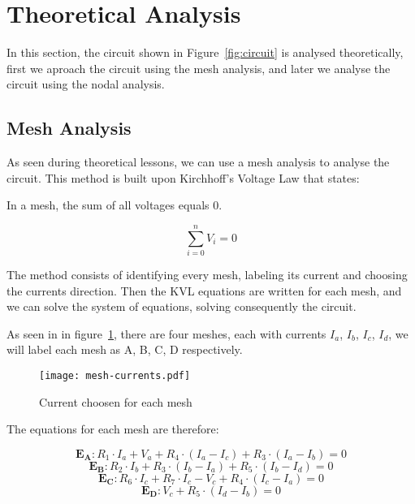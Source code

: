 \section{Theoretical Analysis}
\label{sec:analysis}

In this section, the circuit shown in Figure~\ref{fig:circuit} is analysed
theoretically, first we aproach the circuit using the mesh analysis, and later we analyse the circuit using the nodal analysis.

\subsection{Mesh Analysis}

As seen during theoretical lessons, we can use a mesh analysis to analyse the circuit.
This method is built upon Kirchhoff's Voltage Law that states:

In a mesh, the sum of all voltages equals 0.

\begin{equation}
  \sum_{i=0}^{n} V_i = 0
  \label{eq:kvl}
\end{equation}

The method consists of identifying every mesh, labeling its current and choosing the currents direction.
Then the KVL equations are written for each mesh, and we can solve the system of equations, solving consequently the circuit.

As seen in in figure~\ref{fig:mesh}, there are four meshes, each with currents $I_a$, $I_b$, $I_c$, $I_d$, 
we will label each mesh as A, B, C, D respectively.
\begin{figure}[h] \centering
  \texttt{[image: mesh-currents.pdf]}
  \caption{Current choosen for each mesh}
  \label{fig:mesh}
  \end{figure}

The equations for each mesh are therefore:

\begin{equation}
  \mathbf{E_A} : R_1 \cdot I_a + V_a + R_4 \cdot ( I_a -I_c )+ R_3 \cdot ( I_a - I_b ) = 0
  \label{eq:kvlA}
\end{equation}
\begin{equation}
  \mathbf{E_B} : R_2 \cdot I_b + R_3 \cdot ( I_b - I_a ) + R_5 \cdot ( I_b - I_d ) = 0
  \label{eq:kvlB}
\end{equation}
\begin{equation}
  \mathbf{E_C} : R_6 \cdot I_c + R_7 \cdot I_c - V_c +  R_4 \cdot ( I_c -I_a ) = 0
  \label{eq:kvlC}
\end{equation}
\begin{equation}
  \mathbf{E_D} : V_c + R_5 \cdot ( I_d - I_b )= 0
  \label{eq:kvlD}
\end{equation}


